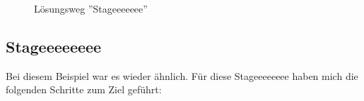 \documentclass[12pt, a4paper, titlepage, oneside]{scrartcl}
\begin{document}
	\begin{figure}[h!]
		\centering
		\caption{Lösungsweg ''Stageeeeeee''}
		\label{fig:stageeeeeee_solution}
	\end{figure}

	\newpage

	\subsection{Stageeeeeeee}
	Bei diesem Beispiel war es wieder ähnlich. Für diese Stageeeeeeee haben mich
	die folgenden Schritte zum Ziel geführt:
\end{document}
